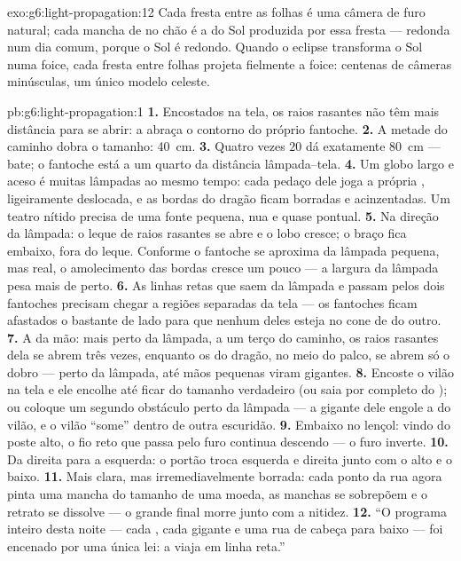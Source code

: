 \begin{solution}{exo:g6:light-propagation:12}
Cada fresta entre as folhas é uma câmera de furo natural; cada mancha
de  no chão é a  do Sol produzida por essa fresta --- redonda
num dia comum, porque o Sol é redondo. Quando o eclipse transforma o
Sol numa foice, cada fresta entre folhas projeta fielmente a foice:
centenas de câmeras minúsculas, um único modelo celeste.
\end{solution}

\begin{solution}{pb:g6:light-propagation:1}
\textbf{1.} Encostados na tela, os raios rasantes não têm mais
distância para se abrir: a  abraça o contorno do próprio
fantoche.
\textbf{2.} A metade do caminho dobra o tamanho: \qty{40}{cm}.
\textbf{3.} Quatro vezes $20$ dá exatamente \qty{80}{cm} --- bate; o
fantoche está a um quarto da distância lâmpada--tela.
\textbf{4.} Um globo largo e aceso é muitas lâmpadas ao mesmo tempo:
cada pedaço dele joga a própria , ligeiramente deslocada, e as
bordas do dragão ficam borradas e acinzentadas. Um teatro nítido
precisa de uma fonte pequena, nua e quase pontual.
\textbf{5.} Na direção da lâmpada: o leque de raios rasantes se abre
e o lobo cresce; o braço fica embaixo, fora do leque. Conforme o
fantoche se aproxima da lâmpada pequena, mas real, o amolecimento das
bordas cresce um pouco --- a largura da lâmpada pesa mais de perto.
\textbf{6.} As linhas retas que saem da lâmpada e passam pelos dois
fantoches precisam chegar a regiões separadas da tela --- os
fantoches ficam afastados o bastante de lado para que nenhum deles
esteja no cone de  do outro.
\textbf{7.} A da mão: mais perto da lâmpada, a um terço do caminho,
os raios rasantes dela se abrem três vezes, enquanto os do dragão, no
meio do palco, se abrem só o dobro --- perto da lâmpada, até mãos
pequenas viram gigantes.
\textbf{8.} Encoste o vilão na tela e ele encolhe até ficar do
tamanho verdadeiro (ou saia por completo do ); ou coloque um
segundo obstáculo perto da lâmpada --- a  gigante dele engole a
do vilão, e o vilão ``some'' dentro de outra escuridão.
\textbf{9.} Embaixo no lençol: vindo do poste alto, o fio reto que
passa pelo furo continua descendo --- o furo inverte.
\textbf{10.} Da direita para a esquerda: o portão troca esquerda e
direita junto com o alto e o baixo.
\textbf{11.} Mais clara, mas irremediavelmente borrada: cada ponto da
rua agora pinta uma mancha do tamanho de uma moeda, as manchas se
sobrepõem e o retrato se dissolve --- o grande final morre junto com
a nitidez.
\textbf{12.} ``O programa inteiro desta noite --- cada , cada
gigante e uma rua de cabeça para baixo --- foi encenado por uma
única lei: a  viaja em linha reta.''
\end{solution}
